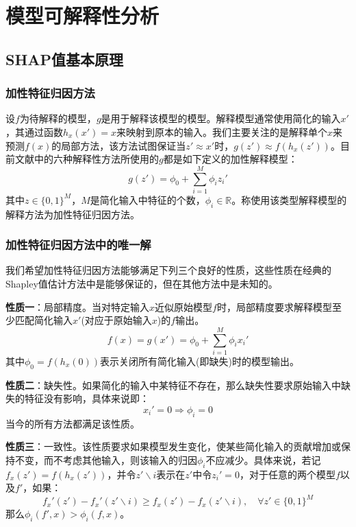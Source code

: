 \documentclass[12pt, a4paper, oneside]{ctexart}
\numberwithin{equation}{section}  %
\let\geq=\geqslant %
\def\R{\mathbb{R}}          %
\begin{document}
\section{模型可解释性分析}
\subsection{SHAP值基本原理}
\subsubsection{加性特征归因方法}
设$f$为待解释的模型，$g$是用于解释该模型的模型。解释模型通常使用简化的输入$x'$，其通过函数$h_x(x')=x$来映射到原本的输入。我们主要关注的是解释单个$x$来预测$f(x)$的局部方法，该方法试图保证当$z'\approx x'$时，$g(z')\approx f(h_x(z'))$。目前文献中的六种解释性方法所使用的$g$都是如下定义的加性解释模型：
\begin{equation}\label{eq-shap-line}
    g(z')=\phi_0+\sum\limits_{i=1}^{M}\phi_iz_i'
\end{equation}
其中$z\in\{0,1\}^M$，$M$是简化输入中特征的个数，$\phi_i\in\R$。称使用该类型解释模型的解释方法为加性特征归因方法。
\subsubsection{加性特征归因方法中的唯一解}
我们希望加性特征归因方法能够满足下列三个良好的性质，这些性质在经典的Shapley值估计方法中是能够保证的，但在其他方法中是未知的。


\textbf{性质一}：局部精度。当对特定输入$x$近似原始模型$f$时，局部精度要求解释模型至少匹配简化输入$x'$(对应于原始输入$x$)的$f$输出。
\begin{equation}\label{eq-prop1}
    f(x)=g(x')=\phi_0+\sum\limits_{i=1}^{M}\phi_ix_i'
\end{equation}
其中$\phi_0=f(h_x(0))$表示关闭所有简化输入(即缺失)时的模型输出。

\textbf{性质二}：缺失性。如果简化的输入中某特征不存在，那么缺失性要求原始输入中缺失的特征没有影响，具体来说即：
\begin{equation}\label{eq-prop2}
    x_i'=0\Rightarrow \phi_i=0
\end{equation}
当今的所有方法都满足该性质。

\textbf{性质三}：一致性。该性质要求如果模型发生变化，使某些简化输入的贡献增加或保持不变，而不考虑其他输入，则该输入的归因$\phi_i$不应减少。具体来说，若记$f_x(z')=f(h_x(z'))$，并令$z'\backslash i$表示在$z'$中令$z_i'=0$，对于任意的两个模型$f$以及$f'$，如果：
\begin{equation}\label{eq-prop3}
    f_x'(z')-f_x'(z'\backslash i)\geq f_x(z')-f_x(z'\backslash i),\quad\forall z'\in\{0,1\}^{M}
\end{equation}
那么$\phi_i(f',x)>\phi_i(f,x)$。
\end{document}
